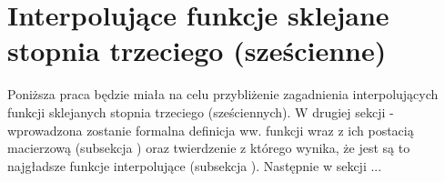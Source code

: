 \section{Interpolujące funkcje sklejane stopnia trzeciego (sześcienne)} 
\label{sekcja1:wstęp}
Poniższa praca będzie miała na celu przybliżenie zagadnienia interpolujących funkcji 
sklejanych stopnia trzeciego (sześciennych). W drugiej sekcji -  
wprowadzona zostanie formalna definicja ww. funkcji wraz z ich postacią macierzową 
(subsekcja ) oraz twierdzenie z którego wynika, że
jest są to najgładsze funkcje interpolujące (subsekcja ).
Następnie w sekcji ...
